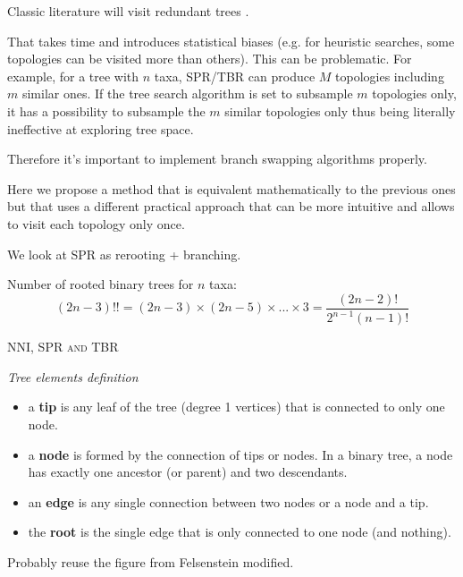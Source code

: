 \documentclass[12pt,letterpaper]{article}
\renewcommand{\section}[1]{%
\bigskip
\begin{center}
\begin{Large}
\normalfont\scshape #1
\medskip
\end{Large}
\end{center}}
\renewcommand{\subsection}[1]{%
\bigskip
\begin{center}
\begin{large}
\normalfont\itshape #1
\end{large}
\end{center}}
\begin{document}
Classic literature will visit redundant trees \citep{felsenstein2004inferring}.

That takes time and introduces statistical biases (e.g. for heuristic searches, some topologies can be visited more than others).
This can be problematic. For example, for a tree with $n$ taxa, SPR/TBR can produce $M$ topologies including $m$ similar ones.
If the tree search algorithm is set to subsample $m$ topologies only, it has a possibility to subsample the $m$ similar topologies only thus being literally ineffective at exploring tree space.


Therefore it's important to implement branch swapping algorithms properly.

Here we propose a method that is equivalent mathematically to the previous ones \citep{felsenstein2004inferring} but that uses a different practical approach that can be more intuitive and allows to visit each topology only once.

We look at SPR as rerooting + branching.

Number of rooted binary trees for $n$ taxa:
\begin{equation}
(2n-3)!!=(2n-3)\times(2n-5)\times...\times3=\frac{(2n-2)!}{2^{n-1}(n-1)!}
\end{equation}

\section{NNI, SPR and TBR}

\subsection{Tree elements definition}
\begin{itemize}
    \item a \textbf{tip} is any leaf of the tree (degree 1 vertices) that is connected to only one node.
    \item a \textbf{node} is formed by the connection of tips or nodes. In a binary tree, a node has exactly one ancestor (or parent) and two descendants.
    \item an \textbf{edge} is any single connection between two nodes or a node and a tip.
    \item the \textbf{root} is the single edge that is only connected to one node (and nothing).
\end{itemize}

Probably reuse the figure from Felsenstein modified. %
\end{document}
